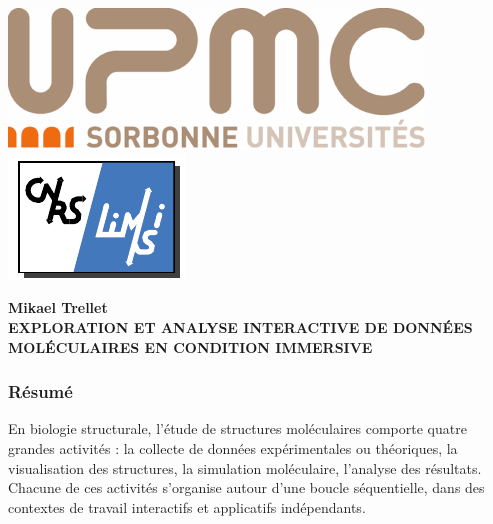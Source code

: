 \backmatter 
\chapter*{}%
\pagestyle{empty}

\setlength{\headheight}{0.pt}
        
\includegraphics[height=1.cm]{./figures/UPMC_these.pdf}\hfill
\includegraphics[height=1.cm]{./figures/limsilogo_vectoriel.pdf}\hfill


\begin{center}
 \textbf{Mikael Trellet} \\
 \textbf{EXPLORATION ET ANALYSE INTERACTIVE DE DONNÉES MOLÉCULAIRES EN CONDITION IMMERSIVE}
\end{center}
    

\footnotesize
\subsection*{Résumé}












\footnotesize
En biologie structurale, l'étude de structures moléculaires comporte quatre grandes activités : la collecte de données expérimentales ou théoriques, la visualisation des structures, la simulation moléculaire, l'analyse des résultats. Chacune de ces activités s'organise autour d'une boucle séquentielle, dans des contextes de travail interactifs et applicatifs indépendants.

